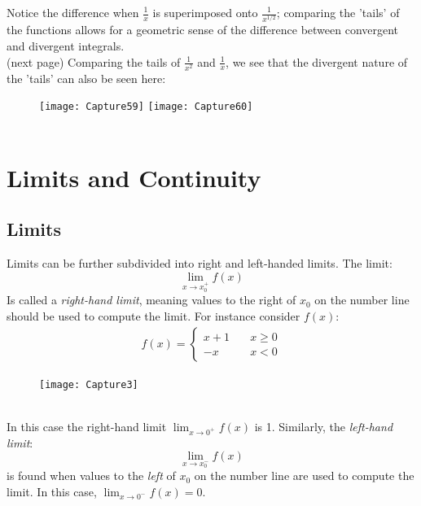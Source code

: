 \documentclass{report}
\begin{document}
Notice the difference when $\frac{1}{x}$ is superimposed onto
$\frac{1}{x^{1/2}}$; comparing the 'tails' of the functions allows for a geometric sense
of the difference between convergent and divergent integrals.\\
(next page)
\newpage
\noindent Comparing the tails of $\frac{1}{x^2}$ and $\frac{1}{x}$, we see that the divergent nature of 
the 'tails' can also be seen here:
\begin{figure}[h]
\texttt{[image: Capture59]}
\texttt{[image: Capture60]}\\
\centering
{}\\
\end{figure}
\newpage


\section{Limits and Continuity} %
\label{fundamentals:limits and continuity}

\subsection{Limits} %
\label{fundamentals:limits and continuity:limits}
Limits can be further subdivided into right and left-handed limits. The limit:
\begin{equation*}
\lim_{x\to x_0^+}f(x)
\end{equation*}
Is called a \textit{right-hand limit}, meaning values to the right of $x_0$ on the number
line should be used to compute the limit. For instance consider $f(x)$:
\begin{align*}
f(x)=
\begin{cases} 
x+1 &\quad x \geq 0 \\
-x  &\quad x < 0
\end{cases}
\end{align*}
\begin{figure}[h]
\texttt{[image: Capture3]}
\centering
\end{figure}\\
In this case the right-hand limit $\lim_{x\to 0^+}f(x)$ is 1. Similarly, the 
\textit{left-hand limit}:
\begin{equation*}
\lim_{x\to x_0^-}f(x)
\end{equation*} 
is found when values to the \textit{left} of $x_0$ on the number line
are used to compute the limit. In this case, $\lim_{x\to 0^-}f(x)=0$.
\end{document}
